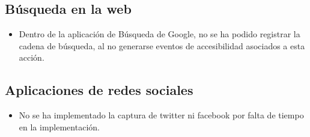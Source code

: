 \documentclass[12pt,a4paper,oneside]{book} %
\begin{document}
\subsection{Búsqueda en la web}
\begin{itemize}
\item Dentro de la aplicación de Búsqueda de Google, no se ha podido registrar la cadena de búsqueda, al no generarse eventos de accesibilidad asociados a esta acción. 
\end{itemize}
\subsection{Aplicaciones de redes sociales}
\begin{itemize}
\item No se ha implementado la captura de twitter ni facebook por falta de tiempo en la implementación. 
\end{itemize}
\end{document}
